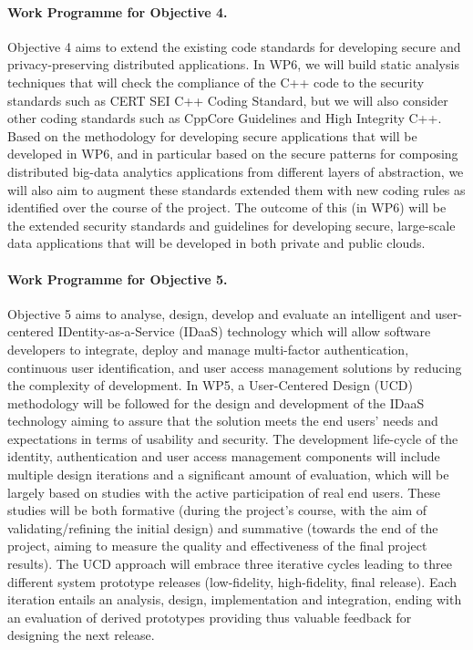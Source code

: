 \documentclass[a4paper,11pt]{article}
\begin{document}
\paragraph{Work Programme for Objective 4.}

Objective 4 aims to extend the existing code standards for developing secure and privacy-preserving distributed applications. In WP6, we will build static analysis techniques that will check the compliance of the C++ code to the security standards such as CERT SEI C++ Coding Standard, but we will also consider other coding standards such as CppCore Guidelines and High Integrity C++. Based on the methodology for developing secure applications that will be developed in WP6, and in particular based on the secure patterns for composing distributed big-data analytics applications from different layers of abstraction, we will also aim to augment these standards extended them with new coding rules as identified over the course of the project. The outcome of this (in WP6) will be the extended security standards and guidelines for developing secure, large-scale data applications that will be developed in both private and public clouds.

\paragraph{Work Programme for Objective 5.}

Objective 5 aims to analyse, design, develop and evaluate an intelligent and user-centered IDentity-as-a-Service (IDaaS) technology which will allow software developers to integrate, deploy and manage multi-factor authentication, continuous user identification, and user access management solutions by reducing the complexity of development. In WP5, a User-Centered Design (UCD) methodology will be followed for the design and development of the IDaaS technology aiming to assure that the solution meets the end users' needs and expectations in terms of usability and security. The development life-cycle of the identity, authentication and user access management components will include multiple design iterations and a significant amount of evaluation, which will be largely based on studies with the active participation of real end users. These studies will be both formative (during the project’s course, with the aim of validating/refining the initial design) and summative (towards the end of the project, aiming to measure the quality and effectiveness of the final project results). The UCD approach will embrace three iterative cycles leading to three different system prototype releases (low-fidelity, high-fidelity, final release). Each iteration entails an analysis, design, implementation and integration, ending with an evaluation of derived prototypes providing thus valuable feedback for designing the next release. 
\end{document}
